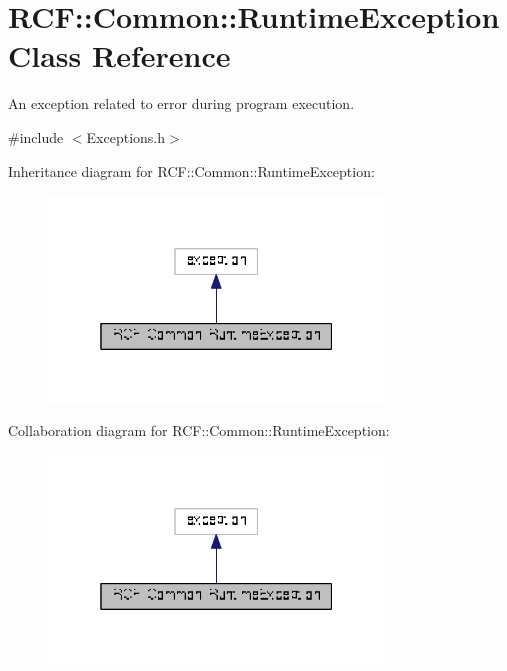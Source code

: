 \hypertarget{class_r_c_f_1_1_common_1_1_runtime_exception}{}\section{R\+C\+F\+:\+:Common\+:\+:Runtime\+Exception Class Reference}
\label{class_r_c_f_1_1_common_1_1_runtime_exception}


An exception related to error during program execution.  




{\ttfamily \#include $<$Exceptions.\+h$>$}



Inheritance diagram for R\+C\+F\+:\+:Common\+:\+:Runtime\+Exception\+:\nopagebreak
\begin{figure}[H]
\begin{center}
\leavevmode
\includegraphics[width=253pt]{class_r_c_f_1_1_common_1_1_runtime_exception__inherit__graph}
\end{center}
\end{figure}


Collaboration diagram for R\+C\+F\+:\+:Common\+:\+:Runtime\+Exception\+:\nopagebreak
\begin{figure}[H]
\begin{center}
\leavevmode
\includegraphics[width=253pt]{class_r_c_f_1_1_common_1_1_runtime_exception__coll__graph}
\end{center}
\end{figure}
